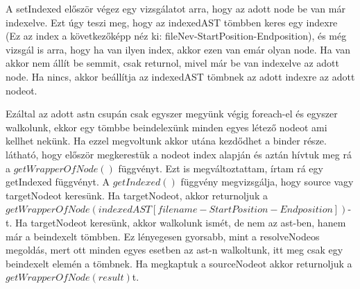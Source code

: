 A setIndexed először végez egy vizsgálatot arra, hogy az adott node be van már indexelve.
Ezt úgy teszi meg, hogy az indexedAST tömbben keres egy indexre (Ez az index a következőképp néz ki: fileNev-StartPosition-Endposition), és még vizsgál is arra, hogy ha van ilyen index, akkor ezen van emár olyan node.
Ha van akkor nem állít be semmit, csak returnol, mivel már be van indexelve az adott node. Ha nincs, akkor beállítja az indexedAST tömbnek az adott indexre az adott nodeot.

\noindent

Ezáltal az adott astn csupán csak egyszer megyünk végig foreach-el és egyszer walkolunk, ekkor egy tömbbe beindelexünk minden egyes létező nodeot ami kellhet nekünk.
Ha ezzel megvoltunk akkor utána kezdődhet a binder része.
 látható, hogy először megkerestük a nodeot index alapján és aztán hívtuk meg rá a ${getWrapperOfNode()}$ függvényt.
Ezt is megváltoztattam, írtam rá egy getIndexed függvényt.
A ${getIndexed()}$ függvény megvizsgálja, hogy source vagy targetNodeot keresünk. Ha targetNodeot, akkor returnoljuk a ${getWrapperOfNode(indexedAST[filename-StartPosition-Endposition])}$-t.
Ha targetNodeot keresünk, akkor walkolunk ismét, de nem az ast-ben, hanem már a beindexelt tömbben.
Ez lényegesen gyorsabb, mint a resolveNodeos megoldás, mert ott minden egyes esetben az ast-n walkoltunk, itt meg csak egy beindexelt elemén a tömbnek.
Ha megkaptuk a sourceNodeot akkor returnoljuk a ${getWrapperOfNode(result)}$t.
